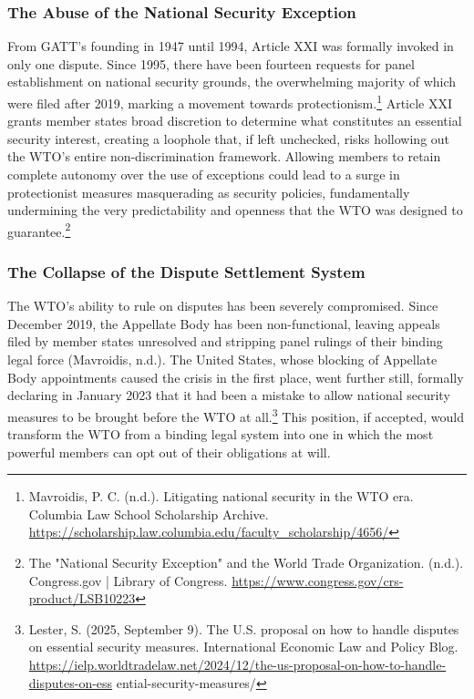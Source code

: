 \subsubsection{The Abuse of the National Security Exception}

From GATT's founding in 1947 until 1994, Article XXI was formally invoked in only one dispute. Since 1995, there have been fourteen requests for panel establishment on national security grounds, the overwhelming majority of which were filed after 2019, marking a movement towards protectionism.\footnote{Mavroidis, P. C. (n.d.). Litigating national security in the WTO era. Columbia Law School Scholarship Archive. \url{https://scholarship.law.columbia.edu/faculty_scholarship/4656/}} Article XXI grants member states broad discretion to determine what constitutes an essential security interest, creating a loophole that, if left unchecked, risks  hollowing  out  the  WTO's  entire non-discrimination framework. Allowing members to retain complete autonomy over the use of exceptions could lead to a surge in protectionist measures masquerading as security policies, fundamentally undermining the very predictability and openness that the WTO was designed to guarantee.\footnote{The "National Security Exception" and the World Trade Organization. (n.d.). Congress.gov | Library of Congress. \url{https://www.congress.gov/crs-product/LSB10223}}

\subsubsection{The Collapse of the Dispute Settlement System}

The WTO's ability to rule on disputes has been severely compromised. Since December 2019, the Appellate Body has been non-functional, leaving appeals filed by member states unresolved and stripping panel rulings of their binding legal force (Mavroidis, n.d.). The United States, whose blocking of Appellate Body appointments caused the crisis in the first place, went further still, formally declaring in January 2023 that it had been a mistake to allow national security measures to be brought before the WTO at all.\footnote{Lester, S. (2025, September 9). The U.S. proposal on how to handle disputes on essential security measures. International Economic Law and Policy Blog. \url{https://ielp.worldtradelaw.net/2024/12/the-us-proposal-on-how-to-handle-disputes-on-ess} ential-security-measures/} This position, if accepted, would transform the WTO from a binding legal system into one in which the most powerful members can opt out of their obligations at will.

